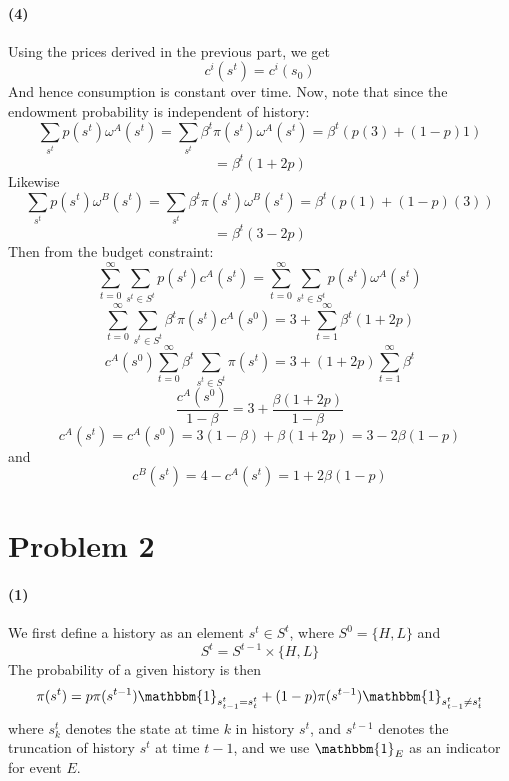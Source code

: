 \documentclass[10pt,letter]{article}
\newcommand{\problem}[1]{\section*{Problem #1}}
\newcommand{\problempart}[1]{\paragraph{#1}}
\begin{document}
\problempart{(4)}
Using the prices derived in the previous part, we get
\[ c^i(s^t) = c^i(s_0) \]
And hence consumption is constant over time. Now, note that since the endowment probability is independent of history:
\[ \sum_{s^t} p(s^t)\omega^A(s^t) = \sum_{s^t} \beta^t \pi(s^t) \omega^A(s^t) = \beta^t (p(3) + (1-p)1 ) \]
\[ = \beta^t (1 + 2p)\]
Likewise
\[ \sum_{s^t} p(s^t)\omega^B(s^t) = \sum_{s^t} \beta^t \pi(s^t) \omega^B(s^t) = \beta^t (p(1) + (1-p)(3) ) \]
\[ = \beta^t (3 - 2p)\]
Then from the budget constraint:
\[ \sum_{t=0}^\infty \sum_{s^t \in S^t} p(s^t) c^A(s^t) = \sum_{t=0}^\infty \sum_{s^t \in S^t} p(s^t) \omega^A(s^t) \]
\[ \sum_{t=0}^\infty \sum_{s^t \in S^t} \beta^t \pi(s^t) c^A(s^0) = 3 + \sum_{t=1}^\infty \beta^t (1 + 2p) \]
\[ c^A(s^0) \sum_{t=0}^\infty \beta^t \sum_{s^t \in S^t}  \pi(s^t)  = 3 + (1 + 2p) \sum_{t=1}^\infty \beta^t  \]
\[ \frac{ c^A(s^0)}{1-\beta} = 3 + \frac{\beta (1 + 2p)}{1-\beta} \]
\[ c^A(s^t) = c^A(s^0) = 3(1-\beta) + \beta(1+2p) = 3 - 2\beta (1-p) \]
and
\[ c^B(s^t) = 4 - c^A(s^t) = 1 + 2\beta (1-p) \]

\pagebreak
\problem{2}

\problempart{(1)}
We first define a history as an element $s^t \in S^t$, where $S^0 = \{ H, L\}$ and
\[ S^t = S^{t-1} \times \{ H, L \} \]
The probability of a given history is then
\[ \pi(s^t) = p \pi(s^{t-1}) \mathbbm{1}_{s^{t}_{t-1} = s^t_{t}} + (1-p) \pi(s^{t-1}) \mathbbm{1}_{s^{t}_{t-1} \neq s^t_{t}}\]
where $s^t_k$ denotes the state at time $k$ in history $s^t$, and $s^{t-1}$ denotes the truncation of history $s^t$ at time $t-1$, and we use $\mathbbm{1}_E$ as an indicator for event $E$.
\end{document}
